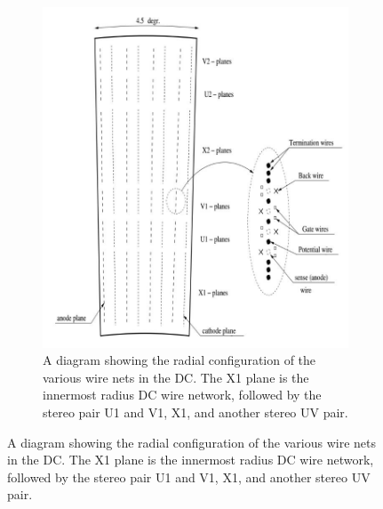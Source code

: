 \begin{figure}
  \centering
\begin{subfigure}[p]{1\textwidth}
  \centering
    \includegraphics[width=1\textwidth]{Figures/dcdiagram.jpg}
  \caption{A diagram showing the radial configuration of the various wire nets in the DC. The X1 plane is the innermost radius DC wire network, followed by the stereo pair U1 and V1, X1, and another stereo UV pair.}
  \label{fig:radialdcdiagram}
\end{subfigure}
\end{figure}
